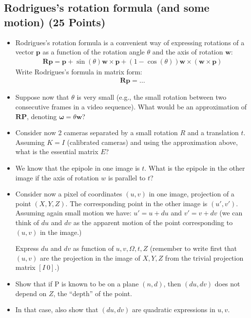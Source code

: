 \documentclass[11pt]{article}
\newcommand{\mat}[1]{\mathbf{#1}}
\begin{document}
\subsection{Rodrigues's rotation formula (and some motion) (25 Points)}
\begin{itemize}

\item Rodrigues's rotation formula is a convenient way of expressing rotations of a vector $\mat{p}$ as 
a function of the rotation angle $\theta$ and the axis of rotation $\mat{w}$:
\begin{align*}
\mat{R}\mat{p} = \mat{p} + \sin(\theta) \mat{w} \times \mat{p} + (1 - \cos(\theta)) \mat{w} \times(\mat{w} \times \mat{p})
\end{align*}
Write Rodrigues's formula in matrix form:
\begin{align*}
\mat{R}\mat{p}=\ldots
\end{align*}
\item Suppose now that $\theta$ is very small (e.g., the small rotation between two consecutive frames in a video sequence). 
What would be an approximation of $\mat{RP}$, denoting $\mat{\omega} = \theta \mat{w}$?
\item Consider now 2 cameras separated by a small rotation $R$ and a translation $t$. Assuming $K=I$ (calibrated cameras) and using the approximation above, what is
the essential matrix $E$?

\item We know that the epipole in one image is $t$. What is the epipole in the 
other image if the axis of rotation $w$ is parallel to $t$?

\item Consider now a pixel of coordinates $(u,v)$ in one image, projection
of a point $(X,Y,Z)$. The corresponding point in the other image is $(u',v')$. 
Assuming again small motion we have: $u' = u + du$ and $v' = v + dv$ (we can
think of $du$ and $dv$ as the apparent motion of the point corresponding to $(u,v)$
in the image.)

Express $du$ and $dv$ as function of $u,v,\Omega,t,Z$ (remember to write first that $(u,v)$ are
the projection in the image of $X,Y,Z$ from the trivial projection matrix $[I\ 0]$.)

\item Show that if P is known to be on a plane $(n,d)$, then $(du,dv)$ does not depend on $Z$, the 
``depth'' of the point.

\item In that case, also show that $(du,dv)$ are quadratic expressions in $u,v$.


\end{itemize}
\end{document}
